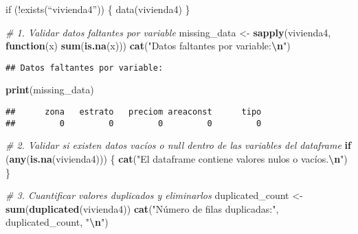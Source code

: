 \documentclass[
]{article}
\newenvironment{Shaded}{\begin{snugshade}}{\end{snugshade}}
\newcommand{\CommentTok}[1]{\textcolor[rgb]{0.56,0.35,0.01}{\textit{#1}}}
\newcommand{\ControlFlowTok}[1]{\textcolor[rgb]{0.13,0.29,0.53}{\textbf{#1}}}
\newcommand{\FunctionTok}[1]{\textcolor[rgb]{0.13,0.29,0.53}{\textbf{#1}}}
\newcommand{\NormalTok}[1]{#1}
\newcommand{\OtherTok}[1]{\textcolor[rgb]{0.56,0.35,0.01}{#1}}
\newcommand{\SpecialCharTok}[1]{\textcolor[rgb]{0.81,0.36,0.00}{\textbf{#1}}}
\newcommand{\StringTok}[1]{\textcolor[rgb]{0.31,0.60,0.02}{#1}}
\begin{document}
if (!exists(``vivienda4'')) \{ data(vivienda4) \}

\begin{Shaded}
\begin{Highlighting}[]
\CommentTok{\# 1. Validar datos faltantes por variable}
\NormalTok{missing\_data }\OtherTok{\textless{}{-}} \FunctionTok{sapply}\NormalTok{(vivienda4, }\ControlFlowTok{function}\NormalTok{(x) }\FunctionTok{sum}\NormalTok{(}\FunctionTok{is.na}\NormalTok{(x)))}
\FunctionTok{cat}\NormalTok{(}\StringTok{"Datos faltantes por variable:}\SpecialCharTok{\textbackslash{}n}\StringTok{"}\NormalTok{)}
\end{Highlighting}
\end{Shaded}

\begin{verbatim}
## Datos faltantes por variable:
\end{verbatim}

\begin{Shaded}
\begin{Highlighting}[]
\FunctionTok{print}\NormalTok{(missing\_data)}
\end{Highlighting}
\end{Shaded}

\begin{verbatim}
##      zona   estrato   preciom areaconst      tipo 
##         0         0         0         0         0
\end{verbatim}

\begin{Shaded}
\begin{Highlighting}[]
\CommentTok{\# 2. Validar si existen datos vacíos o null dentro de las variables del dataframe}
\ControlFlowTok{if}\NormalTok{ (}\FunctionTok{any}\NormalTok{(}\FunctionTok{is.na}\NormalTok{(vivienda4))) \{}
  \FunctionTok{cat}\NormalTok{(}\StringTok{"El dataframe contiene valores nulos o vacíos.}\SpecialCharTok{\textbackslash{}n}\StringTok{"}\NormalTok{)}
\NormalTok{\}}
\end{Highlighting}
\end{Shaded}

\begin{Shaded}
\begin{Highlighting}[]
\CommentTok{\# 3. Cuantificar valores duplicados y eliminarlos}
\NormalTok{duplicated\_count }\OtherTok{\textless{}{-}} \FunctionTok{sum}\NormalTok{(}\FunctionTok{duplicated}\NormalTok{(vivienda4))}
\FunctionTok{cat}\NormalTok{(}\StringTok{"Número de filas duplicadas:"}\NormalTok{, duplicated\_count, }\StringTok{"}\SpecialCharTok{\textbackslash{}n}\StringTok{"}\NormalTok{)}
\end{Highlighting}
\end{Shaded}
\end{document}
